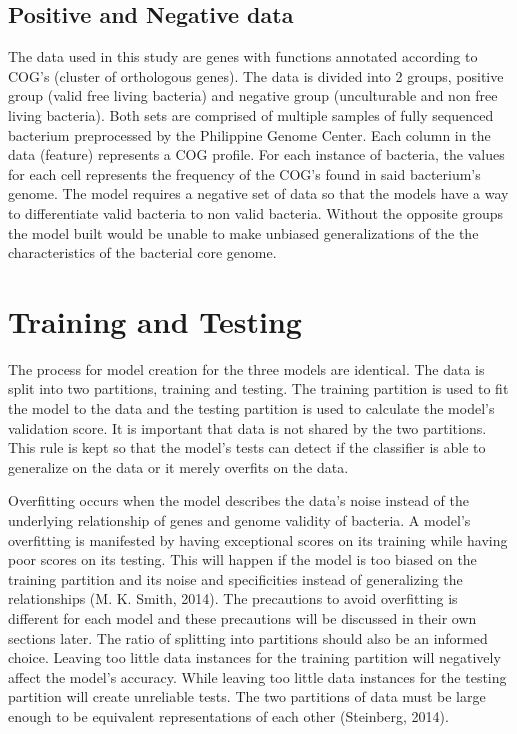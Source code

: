 \documentclass[]{report}
\begin{document}
\subsection{Positive and Negative
data}\label{positive-and-negative-data}

The data used in this study are genes with functions annotated according
to COG's (cluster of orthologous genes). The data is divided into 2
groups, positive group (valid free living bacteria) and negative group
(unculturable and non free living bacteria). Both sets are comprised of
multiple samples of fully sequenced bacterium preprocessed by the
Philippine Genome Center. Each column in the data (feature) represents a
COG profile. For each instance of bacteria, the values for each cell
represents the frequency of the COG's found in said bacterium's genome.
The model requires a negative set of data so that the models have a way
to differentiate valid bacteria to non valid bacteria. Without the
opposite groups the model built would be unable to make unbiased
generalizations of the the characteristics of the bacterial core genome.

\section{Training and Testing}\label{training-and-testing}

The process for model creation for the three models are identical. The
data is split into two partitions, training and testing. The training
partition is used to fit the model to the data and the testing partition
is used to calculate the model's validation score. It is important that
data is not shared by the two partitions. This rule is kept so that the
model's tests can detect if the classifier is able to generalize on the
data or it merely overfits on the data.

Overfitting occurs when the model describes the data's noise instead of
the underlying relationship of genes and genome validity of bacteria. A
model's overfitting is manifested by having exceptional scores on its
training while having poor scores on its testing. This will happen if
the model is too biased on the training partition and its noise and
specificities instead of generalizing the relationships (M. K. Smith,
2014). The precautions to avoid overfitting is different for each model
and these precautions will be discussed in their own sections later. The
ratio of splitting into partitions should also be an informed choice.
Leaving too little data instances for the training partition will
negatively affect the model's accuracy. While leaving too little data
instances for the testing partition will create unreliable tests. The
two partitions of data must be large enough to be equivalent
representations of each other (Steinberg, 2014).
\end{document}
